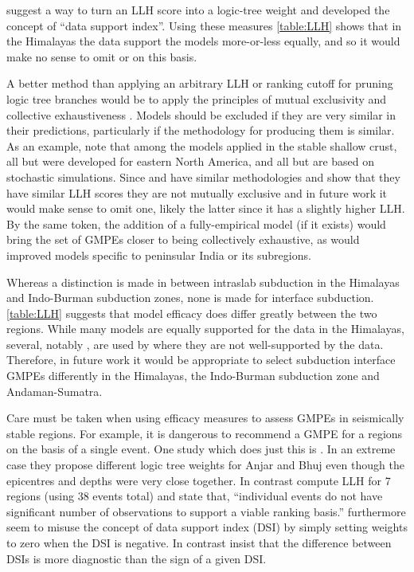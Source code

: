 \documentclass{article}
\begin{document}
\begin{appendices}
\cite{scherbaum2009model} suggest a way to turn an LLH score into a logic-tree weight and \cite{delavaud2012testing} developed the concept of ``data support index''.
Using these measures \autoref{table:LLH} shows that in the Himalayas the data support the models more-or-less equally, and so it would make no sense to omit \cite{youngs1997strong} or \cite{lin2008ground} on this basis.

A better method than applying an arbitrary LLH or ranking cutoff for pruning logic tree branches would be to apply the principles of mutual exclusivity and collective exhaustiveness \citep{scherbaum2009model}. 
Models should be excluded if they are very similar in their predictions, particularly if the methodology for producing them is similar. 
As an example, note that among the models applied in the stable shallow crust, all but \cite{raghukanth2007estimation} were developed for eastern North America, and all but \cite{campbell2003prediction} are based on stochastic simulations. 
Since \cite{atkinson2006earthquake} and \cite{toro2002modification} have similar methodologies and \cite{nath2011peak} show that they have similar LLH scores they are not mutually exclusive and in future work it would make sense to omit one, likely the latter since it has a slightly higher LLH. 
By the same token, the addition of a fully-empirical model (if it exists) would bring the set of GMPEs closer to being collectively exhaustive, as would improved models specific to peninsular India or its subregions.

Whereas a distinction is made in \cite{nath2012probabilistic} between intraslab subduction in the Himalayas and Indo-Burman subduction zones, none is made for interface subduction. 
\autoref{table:LLH} suggests that model efficacy does differ greatly between the two regions. 
While many models are equally supported for the data in the Himalayas, several, notably \cite{kanno2006new}, are used by \cite{nath2012probabilistic} where they are not well-supported by the data. 
Therefore, in future work it would be appropriate to select subduction interface GMPEs differently in the Himalayas, the Indo-Burman subduction zone and Andaman-Sumatra.

Care must be taken when using efficacy measures to assess GMPEs in seismically stable regions. 
For example, it is dangerous to recommend a GMPE for a regions on the basis of a single event.
One study which does just this is \cite{anbazhagan2015selection}.
In an extreme case they propose different logic tree weights for Anjar and Bhuj  even though the epicentres and depths were very close together.
In contrast \cite{nath2011peak} compute LLH for 7 regions (using 38 events total) and state that, ``individual events do not have significant number of observations to support a viable ranking basis.''
\cite{anbazhagan2015selection} furthermore seem to misuse the concept of data support index (DSI) by simply setting weights to zero when the DSI is negative.
In contrast \cite{delavaud2012testing} insist that the difference between DSIs is more diagnostic than the sign of a given DSI.


\end{appendices}
\end{document}
